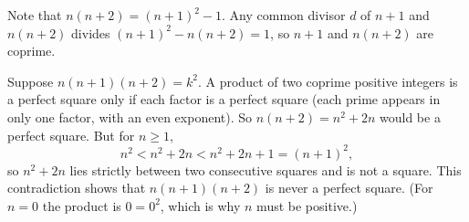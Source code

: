 Note that $n(n+2)=(n+1)^2-1$. Any common divisor $d$ of $n+1$ and $n(n+2)$ divides $(n+1)^2-n(n+2)=1$, so $n+1$ and $n(n+2)$ are coprime.

Suppose $n(n+1)(n+2)=k^2$. A product of two coprime positive integers is a perfect square only if each factor is a perfect square (each prime appears in only one factor, with an even exponent). So $n(n+2)=n^2+2n$ would be a perfect square. But for $n\ge1$,
\[
n^2<n^2+2n<n^2+2n+1=(n+1)^2,
\]
so $n^2+2n$ lies strictly between two consecutive squares and is not a square. This contradiction shows that $n(n+1)(n+2)$ is never a perfect square. (For $n=0$ the product is $0=0^2$, which is why $n$ must be positive.)
